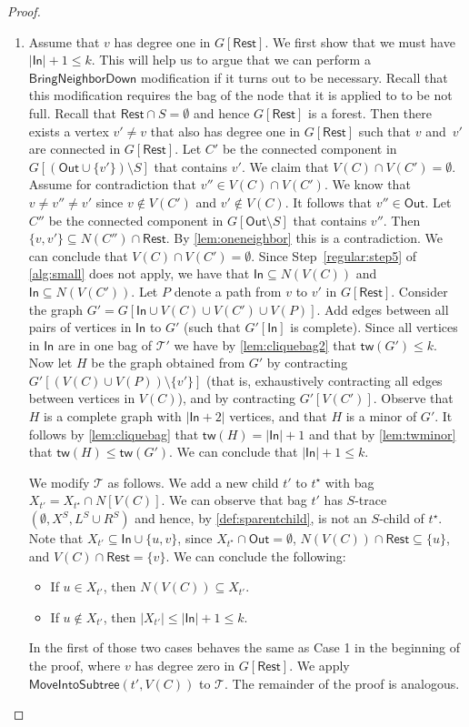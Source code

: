 \documentclass[a4paper,UKenglish,cleveref, autoref, thm-restate, numberwithinsect]{lipics-v2021}
\newcounter{modification}
\newcommand{\tw}{\mathsf{tw}}
\newcommand{\In}{\mathsf{In}}
\newcommand{\Out}{\mathsf{Out}}
\newcommand{\Rest}{\mathsf{Rest}}
\newcommand{\MoveIntoSubtree}{\mathsf{MoveIntoSubtree}}
\newcommand{\BringNeighborDown}{\mathsf{BringNeighborDown}}
\begin{document}
\begin{proof}
\begin{enumerate}
        \item Assume that $v$ has degree one in $G[\Rest]$. 
        We first show that we must have $|\In|+1\le k$. This will help us to argue that we can perform a $\BringNeighborDown$ modification if it turns out to be necessary. Recall that this modification requires the bag of the node that it is applied to to be not full.
        Recall that $\Rest\cap S=\emptyset$ and hence $G[\Rest]$ is a forest. Then there exists a vertex $v'\neq v$ that also has degree one in $G[\Rest]$ such that $v$ and~$v'$ are connected in $G[\Rest]$. 
Let $C'$ be the connected component in $G[(\Out\cup\{v'\})\setminus S]$ that contains $v'$. We claim that $V(C)\cap V(C')=\emptyset$. Assume for contradiction that $v''\in V(C)\cap V(C')$. We know that $v\neq v''\neq v'$ since $v\notin V(C')$ and $v'\notin V(C)$. It follows that $v''\in\Out$. Let $C''$ be the connected component in $G[\Out\setminus S]$ that contains $v''$. Then $\{v,v'\}\subseteq N(C'')\cap \Rest$. By \cref{lem:oneneighbor} this is a contradiction. We can conclude that $V(C)\cap V(C')=\emptyset$.
Since Step~\ref{regular:step5} of \cref{alg:small} does not apply, we have that $\In\subseteq N(V(C))$ and $\In\subseteq N(V(C'))$. Let $P$ denote a path from $v$ to $v'$ in $G[\Rest]$. Consider the graph $G'=G[\In\cup V(C)\cup V(C')\cup V(P)]$. Add edges between all pairs of vertices in $\In$ to $G'$ (such that $G'[\In]$ is complete). Since all vertices in $\In$ are in one bag of $\mathcal{T}'$ we have by \cref{lem:cliquebag2} that $\tw(G')\le k$. Now let $H$ be the graph obtained from $G'$ by contracting $G'[(V(C)\cup V(P))\setminus \{v'\}]$ (that is, exhaustively contracting all edges between vertices in $V(C)$), and by contracting $G'[V(C')]$. Observe that $H$ is a complete graph with $|\In+2|$ vertices, and that $H$ is a minor of $G'$. It follows by \cref{lem:cliquebag} that $\tw(H)=|\In|+1$ and that by \cref{lem:twminor} that $\tw(H)\le\tw(G')$. We can conclude that $|\In|+1\le k$.
        

We modify $\mathcal{T}$ as follows. We add a new child $t'$ to $t^\star$ with bag $X_{t'}=X_{t^\star}\cap N[V(C)]$. We can observe that bag $t'$ has $S$-trace $(\emptyset,X^S,L^S\cup R^S)$ and hence, by \cref{def:sparentchild}, is not an $S$-child of $t^\star$.
Note that $X_{t'}\subseteq \In\cup\{u,v\}$, since $X_{t^\star}\cap\Out=\emptyset$, $N(V(C))\cap \Rest\subseteq\{u\}$, and $V(C)\cap\Rest=\{v\}$.
We can conclude the following:
\begin{itemize}
    \item If $u\in X_{t'}$, then $N(V(C))\subseteq X_{t'}$.
    \item If $u\notin X_{t'}$, then $|X_{t'}|\le |\In|+1\le k$.
\end{itemize}
In the first of those two cases behaves the same as Case 1 in the beginning of  the proof, where $v$ has degree zero in $G[\Rest]$. We apply $\MoveIntoSubtree(t',V(C))$ to $\mathcal{T}$. The remainder of the proof is analogous.


\end{enumerate}
\end{proof}
\end{document}
